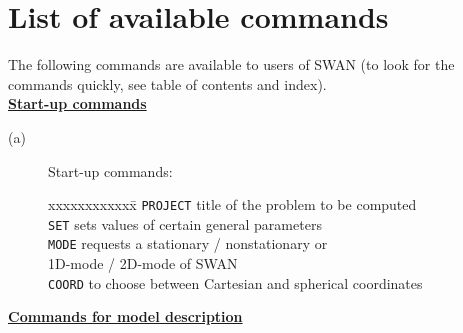 \documentclass[12pt]{book}
\begin{document}
 \label{ch:comm}

\section{List of available commands} \label{sec:lstcomm}
The following commands are available to users of SWAN (to look for the commands quickly, see table of contents
and index).
\\[2ex]
\underline{\bf Start-up commands}
\begin{description}
  \item[(a)] Start-up commands:
\begin{tabbing}
xxxxxxxxxxxx\= \kill
{\tt PROJECT} \> title of the problem to be computed\\
{\tt SET}     \> sets values of certain general parameters\\
{\tt MODE}    \> requests a stationary / nonstationary or\+\\
                 1D-mode / 2D-mode of SWAN\-\\
{\tt COORD}   \> to choose between Cartesian and spherical coordinates\\
\end{tabbing}
\end{description}
\underline{\bf Commands for model description}
\end{document}
